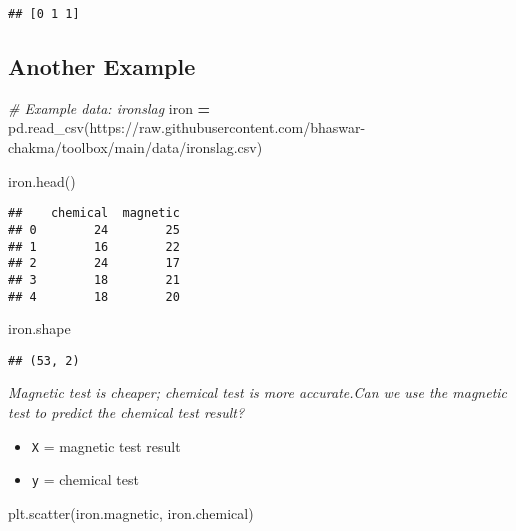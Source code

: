 \documentclass[
]{book}
\newenvironment{Shaded}{\begin{snugshade}}{\end{snugshade}}
\newcommand{\CommentTok}[1]{\textcolor[rgb]{0.56,0.35,0.01}{\textit{#1}}}
\newcommand{\NormalTok}[1]{#1}
\newcommand{\OperatorTok}[1]{\textcolor[rgb]{0.81,0.36,0.00}{\textbf{#1}}}
\newcommand{\StringTok}[1]{\textcolor[rgb]{0.31,0.60,0.02}{#1}}
\begin{document}
\begin{verbatim}
## [0 1 1]
\end{verbatim}

\hypertarget{another-example}{%
\subsection{Another Example}\label{another-example}}

\begin{Shaded}
\begin{Highlighting}[]
\CommentTok{\# Example data: ironslag}
\NormalTok{iron }\OperatorTok{=}\NormalTok{ pd.read\_csv(}\StringTok{\textquotesingle{}https://raw.githubusercontent.com/bhaswar{-}chakma/toolbox/main/data/ironslag.csv\textquotesingle{}}\NormalTok{)}
\end{Highlighting}
\end{Shaded}

\begin{Shaded}
\begin{Highlighting}[]
\NormalTok{iron.head()}
\end{Highlighting}
\end{Shaded}

\begin{verbatim}
##    chemical  magnetic
## 0        24        25
## 1        16        22
## 2        24        17
## 3        18        21
## 4        18        20
\end{verbatim}

\begin{Shaded}
\begin{Highlighting}[]
\NormalTok{iron.shape}
\end{Highlighting}
\end{Shaded}

\begin{verbatim}
## (53, 2)
\end{verbatim}

\emph{Magnetic test is cheaper; chemical test is more accurate.Can we use the magnetic test to predict the chemical test result?}

\begin{itemize}
\item
  \texttt{X} = magnetic test result
\item
  \texttt{y} = chemical test
\end{itemize}

\begin{Shaded}
\begin{Highlighting}[]
\NormalTok{plt.scatter(iron.magnetic, iron.chemical)}
\end{Highlighting}
\end{Shaded}
\end{document}

